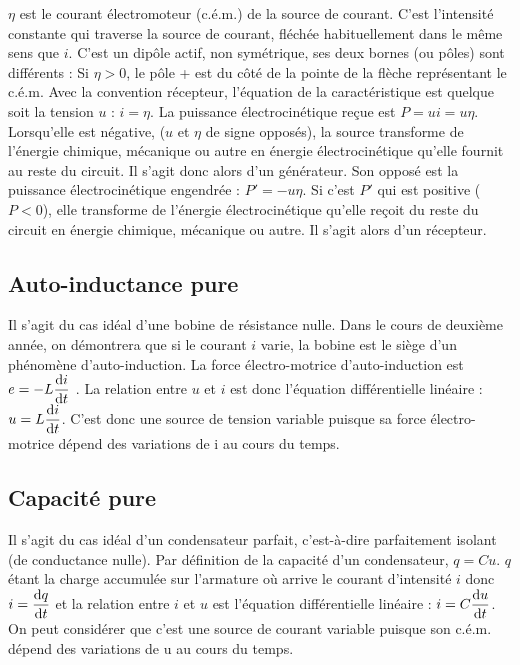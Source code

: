 $\eta$ est le courant électromoteur (c.é.m.) de la source de courant. C'est l'intensité constante qui traverse la source de courant, fléchée habituellement dans le même sens que \(i\).
C'est un dipôle actif, non symétrique, ses deux bornes (ou pôles) sont différents : Si \(\eta > 0\), le pôle + est du côté de la pointe de la flèche représentant le c.é.m. Avec la convention récepteur, l'équation de la caractéristique est quelque soit la tension \(u\) : \(i=\eta\). La puissance électrocinétique reçue est \(P  = u i = u \eta\). Lorsqu'elle est négative, ($u$ et \(\eta\) de signe opposés), la source transforme de l'énergie chimique, mécanique ou autre en énergie électrocinétique qu'elle fournit au reste du circuit. Il s'agit donc alors d'un générateur. Son opposé est la puissance électrocinétique engendrée : \(P' = -u\eta\). Si c'est \(P'\) qui est positive ($P  < 0$), elle transforme de l'énergie électrocinétique qu'elle reçoit du reste du circuit en énergie chimique, mécanique ou autre. Il s'agit alors d'un récepteur.

\subsection{Auto-inductance pure}

Il s'agit du cas idéal d'une bobine de résistance nulle. Dans le cours de deuxième année, on démontrera que si le courant \(i\) varie, la bobine est le siège d'un phénomène d'auto-induction. La force électro-motrice d'auto-induction est \(e = -L\dfrac{\mathrm{d} i}{\mathrm{d} t}\) . La relation entre \(u\) et \(i\) est donc l'équation différentielle linéaire : \(u = L\dfrac{\mathrm{d} i}{\mathrm{d} t}\). C'est donc une source de tension variable puisque sa force électro-motrice dépend des variations de i au cours du temps.

\subsection{Capacité pure}

Il s'agit du cas idéal d'un condensateur parfait, c'est-à-dire parfaitement isolant (de conductance nulle). Par définition de la capacité d'un condensateur, \(q=Cu\). \(q\) étant la charge accumulée sur l'armature où arrive le courant d'intensité \(i\) donc \(i = \dfrac{\mathrm{d} q}{\mathrm{d} t}\)  et la relation entre \(i\) et \(u\) est l'équation différentielle linéaire : \(i=C\dfrac{\mathrm{d} u}{\mathrm{d} t}\). On peut considérer que c'est une source de courant variable puisque son c.é.m. dépend des variations de u au cours du temps.


